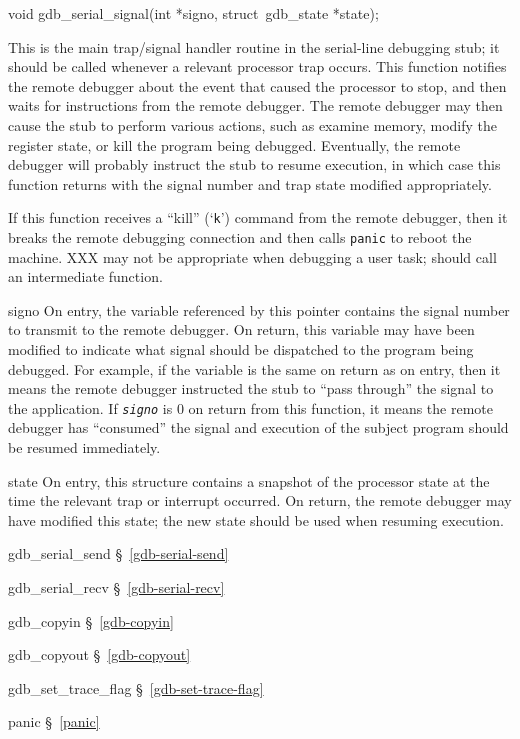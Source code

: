 \label{gdb-serial-signal}
\begin{apisyn}

	\funcproto void gdb_serial_signal(\inoutparam int *signo,
					  \inoutparam struct~gdb_state *state);
\end{apisyn}
\begin{apidesc}
	This is the main trap/signal handler routine
	in the serial-line debugging stub;
	it should be called whenever a relevant processor trap occurs.
	This function notifies the remote debugger
	about the event that caused the processor to stop,
	and then waits for instructions from the remote debugger.
	The remote debugger may then cause the stub to perform various actions,
	such as examine memory, modify the register state,
	or kill the program being debugged.
	Eventually, the remote debugger
	will probably instruct the stub to resume execution,
	in which case this function returns
	with the signal number and trap state modified appropriately.

	If this function receives a ``kill'' (`{\tt k}') command
	from the remote debugger,
	then it breaks the remote debugging connection
	and then calls {\tt panic} to reboot the machine.
	XXX may not be appropriate when debugging a user task;
	should call an intermediate function.
\end{apidesc}
\begin{apiparm}
	\item[signo]
		On entry, the variable referenced by this pointer
		contains the signal number to transmit to the remote debugger.
		On return, this variable may have been modified
		to indicate what signal should be dispatched
		to the program being debugged.
		For example, if the variable is the same on return as on entry,
		then it means the remote debugger instructed the stub
		to ``pass through'' the signal to the application.
		If {\tt *\emph{signo}} is 0 on return from this function,
		it means the remote debugger has ``consumed'' the signal
		and execution of the subject program
		should be resumed immediately.
	\item[state]
		On entry, this structure contains
		a snapshot of the processor state
		at the time the relevant trap or interrupt occurred.
		On return, the remote debugger may have modified this state;
		the new state should be used when resuming execution.
\end{apiparm}
\begin{apidep}
	\item[gdb_serial_send]		\S~\ref{gdb-serial-send}
	\item[gdb_serial_recv]		\S~\ref{gdb-serial-recv}
	\item[gdb_copyin]		\S~\ref{gdb-copyin}
	\item[gdb_copyout]		\S~\ref{gdb-copyout}
	\item[gdb_set_trace_flag]	\S~\ref{gdb-set-trace-flag}
	\item[panic]			\S~\ref{panic}
\end{apidep}


